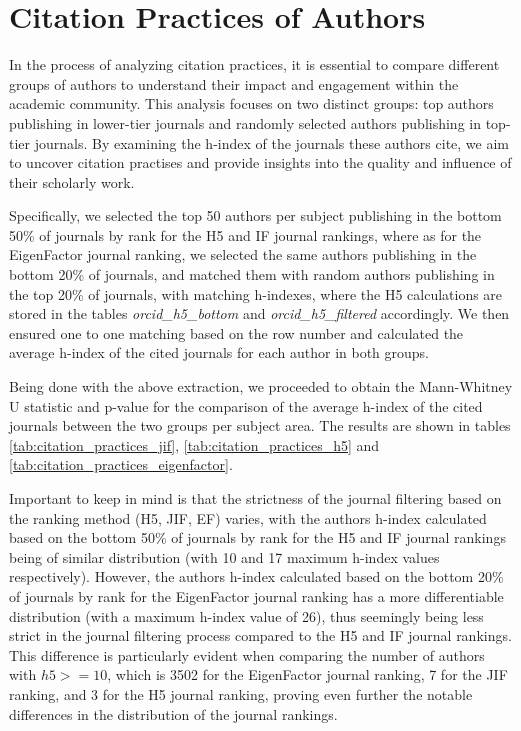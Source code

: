 \section{Citation Practices of Authors}

In the process of analyzing citation practices, it is essential to compare
different groups of authors to understand their impact and engagement within
the academic community. This analysis focuses on two distinct groups: top
authors publishing in lower-tier journals and randomly selected authors
publishing in top-tier journals. By examining the h-index of the journals these
authors cite, we aim to uncover citation practises and provide insights into
the quality and influence of their scholarly work.

Specifically, we selected the top 50 authors per subject publishing in the
bottom 50\% of journals by rank for the H5 and IF journal rankings, where as
for the EigenFactor journal ranking, we selected the same authors publishing in
the bottom 20\% of journals, and matched them with random authors publishing in
the top 20\% of journals, with matching h-indexes, where the H5 calculations
are stored in the tables \emph{orcid\_h5\_bottom} and
\emph{orcid\_h5\_filtered} accordingly. We then ensured one to one matching
based on the row number and calculated the average h-index of the cited
journals for each author in both groups.

Being done with the above extraction, we proceeded to obtain the Mann-Whitney U
statistic and p-value for the comparison of the average h-index of the cited
journals between the two groups per subject area. The results are shown in
tables \ref{tab:citation_practices_jif}, \ref{tab:citation_practices_h5} and
\ref{tab:citation_practices_eigenfactor}.

Important to keep in mind is that the strictness of the journal filtering based
on the ranking method (H5, JIF, EF) varies, with the authors h-index calculated
based on the bottom 50\% of journals by rank for the H5 and IF journal rankings
being of similar distribution (with 10 and 17 maximum h-index values
respectively). However, the authors h-index calculated based on the bottom 20\%
of journals by rank for the EigenFactor journal ranking has a more
differentiable distribution (with a maximum h-index value of 26), thus
seemingly being less strict in the journal filtering process compared to the H5
and IF journal rankings. This difference is particularly evident when comparing
the number of authors with $h5 >= 10$, which is 3502 for the EigenFactor
journal ranking, 7 for the JIF ranking, and 3 for the H5 journal ranking,
proving even further the notable differences in the distribution of the journal
rankings.

